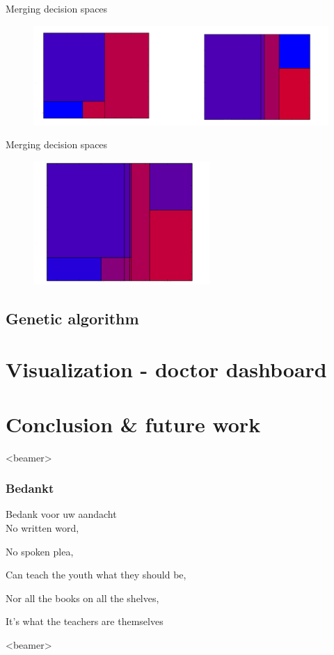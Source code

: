 \documentclass[english]{beamer}
\begin{document}
\begin{frame}{Merging decision spaces}
	\begin{figure}
		\centering
		\includegraphics[width=\textwidth]{figures/merge_space_1.png}
	\end{figure}
\end{frame}

\begin{frame}{Merging decision spaces}
	\begin{figure}
		\centering
		\includegraphics[scale=1]{figures/merge_space_2.png}
	\end{figure}
\end{frame}

\subsection*{Genetic algorithm}
\section{Visualization - doctor dashboard}
\section{Conclusion \& future work}






\begin{frame}<beamer> 
  \frametitle{Bedankt}
	  {\huge \color{ugentyellow} Bedank voor uw aandacht}\\
	  No written word,
	  
	  No spoken plea,
	  
	  Can teach the youth what they should be,
	  
	  Nor all the books on all the shelves,
	  
	  It's what the teachers are themselves 
\end{frame}

\begin{frame}<beamer> 
	\small
	\tableofcontents
\end{frame}
\end{document}
